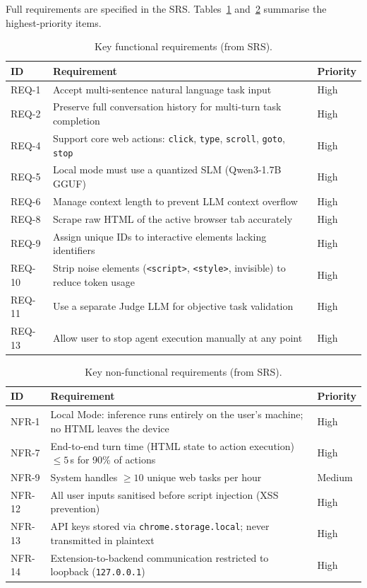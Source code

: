 \documentclass[12pt,a4paper]{report}
\begin{document}
Full requirements are specified in the SRS. Tables~\ref{tab:frs} and~\ref{tab:nfrs} summarise the highest-priority items.

\begin{table}[H]
\centering
\small
\begin{tabular}{p{1.4cm}p{9.8cm}p{1.3cm}}
\toprule
\textbf{ID} & \textbf{Requirement} & \textbf{Priority} \\
\midrule
REQ-1  & Accept multi-sentence natural language task input & High \\
REQ-2  & Preserve full conversation history for multi-turn task completion & High \\
REQ-4  & Support core web actions: \texttt{click}, \texttt{type}, \texttt{scroll}, \texttt{goto}, \texttt{stop} & High \\
REQ-5  & Local mode must use a quantized SLM (Qwen3-1.7B GGUF) & High \\
REQ-6  & Manage context length to prevent LLM context overflow & High \\
REQ-8  & Scrape raw HTML of the active browser tab accurately & High \\
REQ-9  & Assign unique IDs to interactive elements lacking identifiers & High \\
REQ-10 & Strip noise elements (\texttt{<script>}, \texttt{<style>}, invisible) to reduce token usage & High \\
REQ-11 & Use a separate Judge LLM for objective task validation & High \\
REQ-13 & Allow user to stop agent execution manually at any point & High \\
\bottomrule
\end{tabular}
\caption{Key functional requirements (from SRS).}
\label{tab:frs}
\end{table}

\begin{table}[H]
\centering
\small
\begin{tabular}{p{1.4cm}p{9.8cm}p{1.3cm}}
\toprule
\textbf{ID} & \textbf{Requirement} & \textbf{Priority} \\
\midrule
NFR-1  & Local Mode: inference runs entirely on the user's machine; no HTML leaves the device & High \\
NFR-7  & End-to-end turn time (HTML state to action execution) $\leq 5$\,s for 90\% of actions & High \\
NFR-9  & System handles $\geq 10$ unique web tasks per hour & Medium \\
NFR-12 & All user inputs sanitised before script injection (XSS prevention) & High \\
NFR-13 & API keys stored via \texttt{chrome.storage.local}; never transmitted in plaintext & High \\
NFR-14 & Extension-to-backend communication restricted to loopback (\texttt{127.0.0.1}) & High \\
\bottomrule
\end{tabular}
\caption{Key non-functional requirements (from SRS).}
\label{tab:nfrs}
\end{table}
\end{document}
